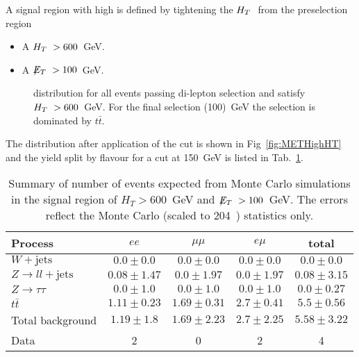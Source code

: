 A signal region with high \HT is defined by tightening the $H_T~$ 
from the preselection region
\begin{itemize}
\item A $H_T~>600$~GeV.
\item A $\displaystyle{\not} E_T~>100$~GeV.
\end{itemize}

\begin{figure}[hbtp]
  \hfill
  \caption{\MET distribution for all events passing di-lepton selection and satisfy $H_T~> 600$~GeV. For the final \MET selection (100)~GeV the selection is dominated by $t\bar{t}$.}
\end{figure}

The \MET distribution after application of the \HT
cut is shown in Fig~\ref{fig:METHighHT} and
the yield split by flavour for a cut at 150~GeV is listed in Tab.~\ref{tab:HighHT}.

\begin{table}[htb]
\begin{center}
\caption{\label{tab:HighHT}\protect Summary of number of events expected from Monte Carlo simulations in 
the signal region of $H_T> 600$~GeV and $\displaystyle{\not} E_T~> 100$~GeV. The errors reflect the Monte Carlo (scaled
    to 204~\pbi) statistics only.}
\begin{tabular}{l|ccc|c}
\hline
Process           & $ee$       & $\mu\mu$     & $e\mu$   & total   \\
\hline\hline
$W+\textrm{jets}$&$0.0 \pm 0.0$&$0.0 \pm 0.0$&$0.0 \pm 0.0$&$0.0 \pm 0.0$\\
$Z\rightarrow ll+\textrm{jets}$&$0.08 \pm 1.47$&$0.0 \pm 1.97$&$0.0 \pm 1.97$&$0.08 \pm 3.15$\\
$Z \rightarrow \tau\tau$&$0.0 \pm 1.0$&$0.0 \pm 1.0$&$0.0 \pm 1.0$&$0.0 \pm 0.27$\\
$t\bar{t}$&$1.11 \pm 0.23$&$1.69 \pm 0.31$&$2.7 \pm 0.41$&$5.5 \pm 0.56$\\
\hline
Total background &$1.19 \pm 1.8$&$1.69 \pm 2.23$&$2.7 \pm 2.25$&$5.58 \pm 3.22$\\
\hline
Data  & 2 & 0 & 2 & 4 \\
\hline\hline
\end{tabular}
\end{center}
\end{table}


